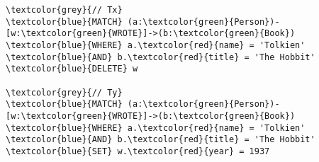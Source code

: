 \begin{Verbatim}[commandchars=\\\{\},fontsize=\small,xleftmargin=.2in]
\textcolor{grey}{// Tx}
\textcolor{blue}{MATCH} (a:\textcolor{green}{Person})-[w:\textcolor{green}{WROTE}]->(b:\textcolor{green}{Book})
\textcolor{blue}{WHERE} a.\textcolor{red}{name} = 'Tolkien' \textcolor{blue}{AND} b.\textcolor{red}{title} = 'The Hobbit'
\textcolor{blue}{DELETE} w

\textcolor{grey}{// Ty}
\textcolor{blue}{MATCH} (a:\textcolor{green}{Person})-[w:\textcolor{green}{WROTE}]->(b:\textcolor{green}{Book})
\textcolor{blue}{WHERE} a.\textcolor{red}{name} = 'Tolkien' \textcolor{blue}{AND} b.\textcolor{red}{title} = 'The Hobbit'
\textcolor{blue}{SET} w.\textcolor{red}{year} = 1937
\end{Verbatim}